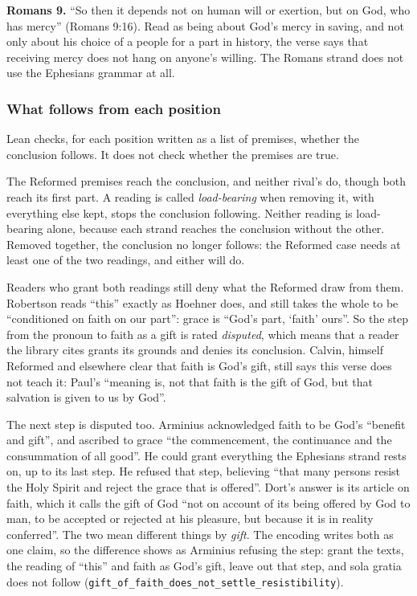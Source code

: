 \documentclass[11pt]{article}
\begin{document}
\textbf{Romans 9.} “So then it depends not on human will or exertion, but on God, who has mercy” (Romans 9:16). Read as being about God’s mercy in saving, and not only about his choice of a people for a part in history, the verse says that receiving mercy does not hang on anyone’s willing. The Romans strand does not use the Ephesians grammar at all.

\subsubsection*{What follows from each position}
Lean checks, for each position written as a list of premises, whether the conclusion follows. It does not check whether the premises are true.

The Reformed premises reach the conclusion, and neither rival’s do, though both reach its first part. A reading is called \emph{load-bearing} when removing it, with everything else kept, stops the conclusion following. Neither reading is load-bearing alone, because each strand reaches the conclusion without the other. Removed together, the conclusion no longer follows: the Reformed case needs at least one of the two readings, and either will do.

Readers who grant both readings still deny what the Reformed draw from them. Robertson reads “this” exactly as Hoehner does, and still takes the whole to be “conditioned on faith on our part”: grace is “God’s part, ‘faith’ ours”. So the step from the pronoun to faith as a gift is rated \emph{disputed}, which means that a reader the library cites grants its grounds and denies its conclusion. Calvin, himself Reformed and elsewhere clear that faith is God’s gift, still says this verse does not teach it: Paul’s “meaning is, not that faith is the gift of God, but that salvation is given to us by God”.

The next step is disputed too. Arminius acknowledged faith to be God’s “benefit and gift”, and ascribed to grace “the commencement, the continuance and the consummation of all good”. He could grant everything the Ephesians strand rests on, up to its last step. He refused that step, believing “that many persons resist the Holy Spirit and reject the grace that is offered”. Dort’s answer is its article on faith, which it calls the gift of God “not on account of its being offered by God to man, to be accepted or rejected at his pleasure, but because it is in reality conferred”. The two mean different things by \emph{gift}. The encoding writes both as one claim, so the difference shows as Arminius refusing the step: grant the texts, the reading of “this” and faith as God’s gift, leave out that step, and sola gratia does not follow (\texttt{gift\_\allowbreak{}of\_\allowbreak{}faith\_\allowbreak{}does\_\allowbreak{}not\_\allowbreak{}settle\_\allowbreak{}resistibility}).
\end{document}
